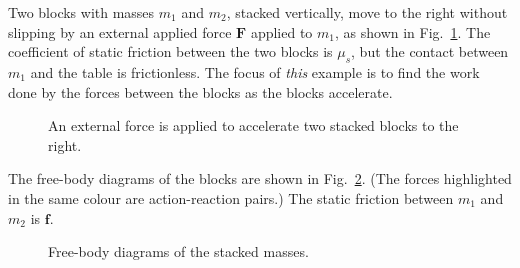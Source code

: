 Two blocks with masses $m_1$ and $m_2$, stacked vertically, move to the right
without slipping by an external applied force $\bm F$ applied to $m_1$, as
shown in Fig.~\ref{stacked1}. The coefficient of static friction between the
two blocks is $\mu_s$, but the contact between $m_1$ and the table is
frictionless. The focus of \emph{this} example is to find the work done by the
forces between the blocks as the blocks accelerate.
\begin{figure}[ht]
  \centering
  \caption{An external force is applied to accelerate two stacked blocks to
    the right.}
  \label{stacked1}
\end{figure}

The free-body diagrams of the blocks are shown in Fig.~\ref{stacked-fbd}.
(The forces highlighted in the same colour are action-reaction pairs.) The
static friction between $m_1$ and $m_2$ is $\bm f$.
\begin{figure}[ht]
  \centering
  \caption{Free-body diagrams of the stacked masses.}
  \label{stacked-fbd}
\end{figure}

